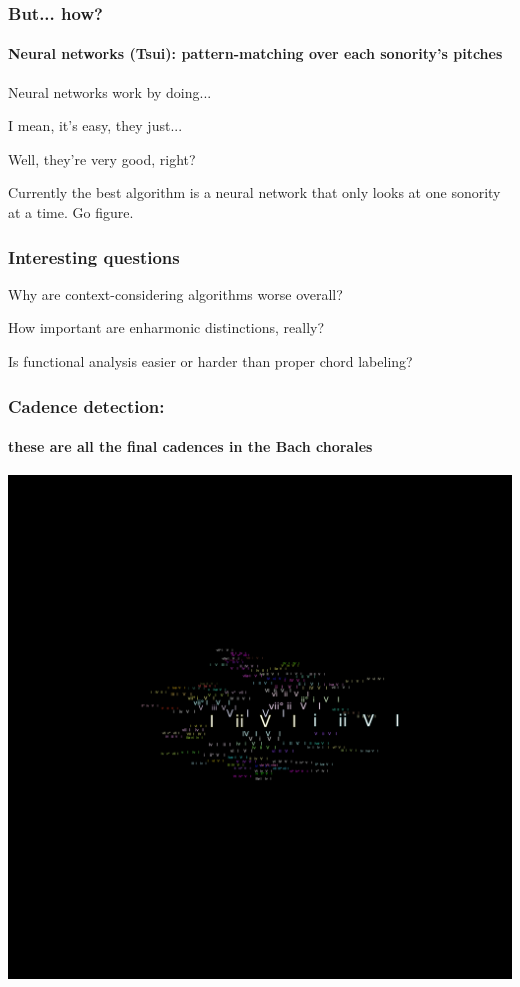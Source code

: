 \documentclass{beamer}
\begin{document}
\begin{frame}
  \frametitle{But... how?}
  \framesubtitle{Neural networks (Tsui): pattern-matching over each sonority's
  pitches}

Neural networks work by doing...
\pause

I mean, it's easy, they just...
\pause

Well, they're very good, right?

\pause
\addvspace{2em}
\begin{small}
  Currently the best algorithm is a neural network that only looks at
  one sonority at a time. \pause Go figure.
\end{small}
\end{frame}

\begin{frame}
  \frametitle{Interesting questions}
  Why are context-considering algorithms worse overall?
  
  \addvspace{2em}

  How important are enharmonic distinctions, really?

  \addvspace{2em}
  
  Is functional analysis easier or harder than proper chord labeling?
\end{frame}

\begin{frame}
  \frametitle{Cadence detection:}
  \framesubtitle{these are all the final cadences in the Bach chorales}
  \centering
  \addvspace{0.5em}
  \includegraphics[scale=0.3, trim = 50em 0em 0em 50em, clip]{figs/cadences}
\end{frame}
\end{document}
